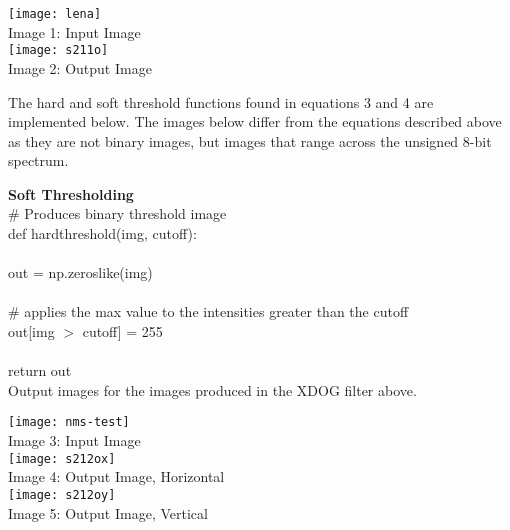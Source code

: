 \documentclass{article}
\begin{document}
	\begin{center}
		\noindent \texttt{[image: lena]}\\
		Image 1: Input Image\\
			
		\texttt{[image: s211o]}\\
		Image 2: Output Image\\
	\end{center}
		
	The hard and soft threshold functions found in equations 3 and 4 are implemented below. The images below differ from the equations described above as they are not binary images, but images that range across the unsigned 8-bit spectrum.\\
		
	\smallskip	
	
	\noindent \textbf{Soft Thresholding}\\
		
	\noindent \# Produces binary threshold image\\
	\noindent def hard\textunderscore threshold(img, cutoff):\\
	\\
	\indent out = np.zeros\textunderscore like(img)\\
	\\
	\indent \# applies the max value to the intensities greater than the cutoff\\
	\indent out[img $>$ cutoff] = 255\\
	\\	
	\indent return out\\
	
	Output images for the images produced in the XDOG filter above.\\
	
	\begin{center}
		\noindent \texttt{[image: nms-test]}\\
		Image 3: Input Image\\
		
		\texttt{[image: s212ox]}\\
		Image 4: Output Image, Horizontal\\
		
		\texttt{[image: s212oy]}\\
		Image 5: Output Image, Vertical\\
	\end{center}
	
	\smallskip
	
\end{document}
